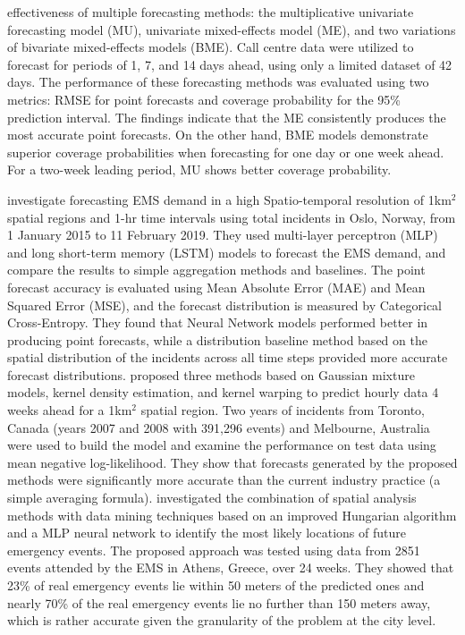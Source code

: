 \documentclass[
  authoryear,
  preprint,
  3p]{elsarticle}
\begin{document}
effectiveness of multiple forecasting methods: the multiplicative
univariate forecasting model (MU), univariate mixed-effects model (ME),
and two variations of bivariate mixed-effects models (BME). Call centre
data were utilized to forecast for periods of 1, 7, and 14 days ahead,
using only a limited dataset of 42 days. The performance of these
forecasting methods was evaluated using two metrics: RMSE for point
forecasts and coverage probability for the 95\% prediction interval. The
findings indicate that the ME consistently produces the most accurate
point forecasts. On the other hand, BME models demonstrate superior
coverage probabilities when forecasting for one day or one week ahead.
For a two-week leading period, MU shows better coverage probability.

\citet{9659837} investigate forecasting EMS demand in a high
Spatio-temporal resolution of 1km\(^2\) spatial regions and 1-hr time
intervals using total incidents in Oslo, Norway, from 1 January 2015 to
11 February 2019. They used multi-layer perceptron (MLP) and long
short-term memory (LSTM) models to forecast the EMS demand, and compare
the results to simple aggregation methods and baselines. The point
forecast accuracy is evaluated using Mean Absolute Error (MAE) and Mean
Squared Error (MSE), and the forecast distribution is measured by
Categorical Cross-Entropy. They found that Neural Network models
performed better in producing point forecasts, while a distribution
baseline method based on the spatial distribution of the incidents
across all time steps provided more accurate forecast distributions.
\citet{zhou2016predictinglit} proposed three methods based on Gaussian
mixture models, kernel density estimation, and kernel warping to predict
hourly data 4 weeks ahead for a 1km\(^2\) spatial region. Two years of
incidents from Toronto, Canada (years 2007 and 2008 with 391,296 events)
and Melbourne, Australia were used to build the model and examine the
performance on test data using mean negative log-likelihood. They show
that forecasts generated by the proposed methods were significantly more
accurate than the current industry practice (a simple averaging
formula). \citet{grekousis2019will} investigated the combination of
spatial analysis methods with data mining techniques based on an
improved Hungarian algorithm and a MLP neural network to identify the
most likely locations of future emergency events. The proposed approach
was tested using data from 2851 events attended by the EMS in Athens,
Greece, over 24 weeks. They showed that 23\% of real emergency events
lie within 50 meters of the predicted ones and nearly 70\% of the real
emergency events lie no further than 150 meters away, which is rather
accurate given the granularity of the problem at the city level.
\end{document}
